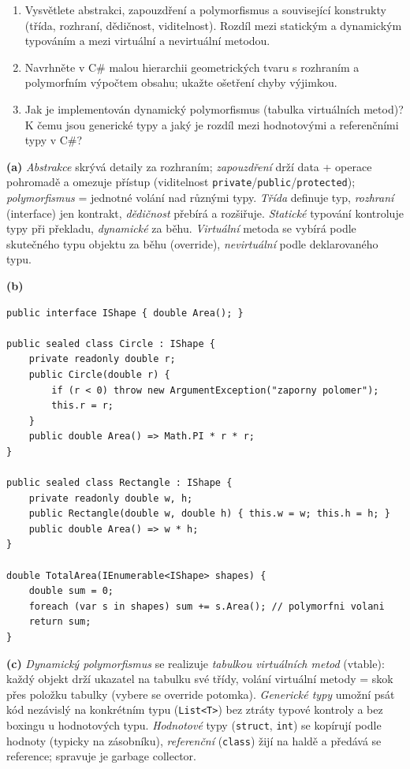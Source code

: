 \begin{zadani}
\begin{enumerate}[label=(\alph*)]
  \item {} Vysvětlete abstrakci, zapouzdření a polymorfismus a související konstrukty (třída, rozhraní, dědičnost, viditelnost). Rozdíl mezi statickým a dynamickým typováním a mezi virtuální a nevirtuální metodou.
  \item {} Navrhněte v C\# malou hierarchii geometrických tvaru s rozhraním a polymorfním výpočtem obsahu; ukažte ošetření chyby výjimkou.
  \item {} Jak je implementován dynamický polymorfismus (tabulka virtuálních metod)? K čemu jsou generické typy a jaký je rozdíl mezi hodnotovými a referenčními typy v C\#?
\end{enumerate}
\end{zadani}

\begin{reseni}
\textbf{(a)} \emph{Abstrakce} skrývá detaily za rozhraním; \emph{zapouzdření} drží data + operace pohromadě a omezuje přístup (viditelnost \texttt{private}/\texttt{public}/\texttt{protected}); \emph{polymorfismus} = jednotné volání nad různými typy. \emph{Třída} definuje typ, \emph{rozhraní} (interface) jen kontrakt, \emph{dědičnost} přebírá a rozšiřuje. \emph{Statické} typování kontroluje typy při překladu, \emph{dynamické} za běhu. \emph{Virtuální} metoda se vybírá podle skutečného typu objektu za běhu (override), \emph{nevirtuální} podle deklarovaného typu.

\textbf{(b)}
\begin{lstlisting}
public interface IShape { double Area(); }

public sealed class Circle : IShape {
    private readonly double r;
    public Circle(double r) {
        if (r < 0) throw new ArgumentException("zaporny polomer");
        this.r = r;
    }
    public double Area() => Math.PI * r * r;
}

public sealed class Rectangle : IShape {
    private readonly double w, h;
    public Rectangle(double w, double h) { this.w = w; this.h = h; }
    public double Area() => w * h;
}

double TotalArea(IEnumerable<IShape> shapes) {
    double sum = 0;
    foreach (var s in shapes) sum += s.Area(); // polymorfni volani
    return sum;
}
\end{lstlisting}

\textbf{(c)} \emph{Dynamický polymorfismus} se realizuje \emph{tabulkou virtuálních metod} (vtable): každý objekt drží ukazatel na tabulku své třídy, volání virtuální metody = skok přes položku tabulky (vybere se override potomka). \emph{Generické typy} umožní psát kód nezávislý na konkrétním typu (\texttt{List<T>}) bez ztráty typové kontroly a bez boxingu u hodnotových typu. \emph{Hodnotové} typy (\texttt{struct}, \texttt{int}) se kopírují podle hodnoty (typicky na zásobníku), \emph{referenční} (\texttt{class}) žijí na haldě a předává se reference; spravuje je garbage collector.
\end{reseni}

